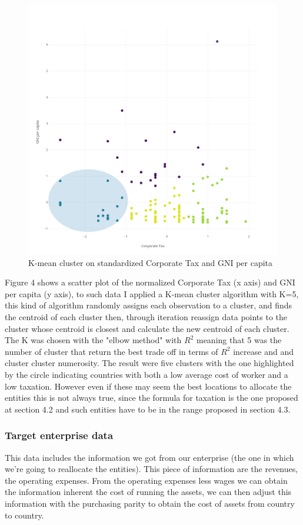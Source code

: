 \documentclass{article}
\begin{document}
\begin{figure}[ht]
\centering
\includegraphics[width=0.8\linewidth]{Images/Cluster-GNI-CT.png}
\caption{K-mean cluster on standardized Corporate Tax and GNI per capita}
\end{figure}

Figure 4 shows a scatter plot of the normalized Corporate Tax (x axis) and GNI per capita (y axis), to such data I applied a K-mean cluster algorithm with K=5, this kind of algorithm randomly assigns each observation to a cluster, and finds the centroid of each cluster then, through iteration reassign data points to the cluster whose centroid is closest and calculate the new centroid of each cluster. The K was chosen with the "elbow method" with $R^2$ meaning that 5 was the number of cluster that return the best trade off in terms of $R^2$ increase and and cluster cluster numerosity. 
The result were five clusters with the one highlighted by the circle indicating countries with both a low average cost of worker and a low taxation. However even if these may seem the best locations to allocate the entities this is not always true, since the formula for taxation is the one proposed at section 4.2 and such entities have to be in the range proposed in section 4.3. 

\subsubsection{Target enterprise data}
This data includes the information we got from our enterprise (the one in which we're going to reallocate the entities). This piece of information are the revenues, the operating expenses. From the operating expenses less wages we can obtain the information inherent the cost of running the assets\cite{williams_financial_2008}, we can then adjust this information with the purchasing parity to obtain the cost of assets from country to country. 
\end{document}
